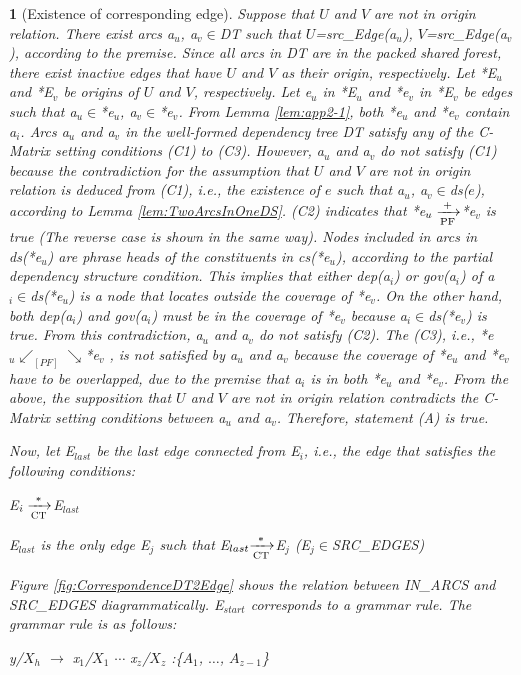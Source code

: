 \documentclass[english]{jnlp_1.4_rep}
\theoremstyle{break}
\theoremstyle{plain}
\newtheorem{lemma}{}[]
\theoremstyle{plain}
\begin{document}
\begin{lemma}[Existence of corresponding edge]
{Suppose that $U$ and $V$ are not in origin relation. There exist arcs
a$_u$, a$_v \in$DT such that $U$=src\_Edge(a$_u$),
$V$=src\_Edge(a$_v$), according to the premise. Since all arcs in DT
are in the packed shared forest, there exist inactive edges that have
$U$ and $V$ as their origin, respectively. Let *E$_u$ and *E$_v$ be
origins of $U$ and $V$, respectively. Let e$_u$ in *E$_u$ and *e$_v$
in *E$_v$ be edges such that a$_u \in$*e$_u$,
a$_v \in$*e$_v$. From Lemma \ref{lem:app2-1}, both *e$_u$ and
*e$_v$ contain a$_i$. Arcs a$_u$ and a$_v$ in the well-formed
dependency tree DT satisfy any of the C-Matrix setting conditions
(C1) to (C3). However, a$_u$ and a$_v$ do not satisfy (C1) because the
contradiction for the assumption that $U$ and $V$ are not in origin
relation is deduced from (C1), i.e., the existence of $e$ such that
a$_u$, a$_v \in$ds($e$), according to Lemma
\ref{lem:TwoArcsInOneDS}. (C2) indicates that *e$_u \xrightarrow[{\rm
      PF}]{+}$*e$_v$ is true (The reverse case is shown in the same
way). Nodes included in arcs in ds(*e$_u$) are phrase heads of the
constituents in cs(*e$_u$), according to the partial dependency
structure condition. This implies that either dep(a$_i$) or gov(a$_i$)
of a$_i \in$ds(*e$_u$) is a node that locates outside the
coverage of *e$_v$. On the other hand, both dep(a$_i$) and gov(a$_i$)
must be in the coverage of *e$_v$ because a$_i \in$ds(*e$_v$) is
true. From this contradiction, a$_u$ and a$_v$ do not satisfy
(C2). The (C3), i.e., *e$_u \swarrow_{[PF]} \searrow$*e$_v$ ,
is not satisfied by a$_u$ and a$_v$ because the coverage of *e$_u$ and
*e$_v$ have to be overlapped, due to the premise that a$_i$ is in both
*e$_u$ and *e$_v$. From the above, the supposition that $U$ and $V$
are not in origin relation contradicts the C-Matrix setting conditions
between a$_u$ and a$_v$. Therefore, statement (A) is true.

\noindent
Now, let E$_{last}$ be the last edge connected from
E$_i$, i.e., the edge that satisfies the following conditions:

E$_i \xrightarrow[{\rm CT}]{*}$E$_{last}$ 

E$_{last}$ is the only edge E$_j$ such that
E$_{last}{\xrightarrow[{\rm CT}]{*}}$E$_j$ (E$_j \in$SRC\_EDGES)

\noindent
Figure \ref{fig:CorrespondenceDT2Edge} shows the relation between
IN\_ARCS and SRC\_EDGES diagrammatically. E$_{start}$ corresponds to a
grammar rule. The grammar rule is as follows:

\begin{center}
y/$X_h$ $\rightarrow$ x$_1$/$X_1$ ${\cdots}$ x$_z$/$X_z$ :\{$A_1$, ${\ldots}$, $A_{z-1}$\}
\end{center}

}
\end{lemma}
\end{document}
